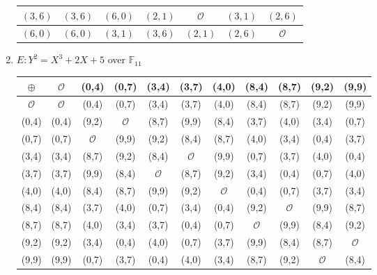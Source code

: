 \documentclass[a4paper, 11pt]{article}
\begin{document}
\begin{enumerate}[label=(\alph*)]
\begin{tabular}{|c|c|c|c|c|c|c|}
                $(3,6)$         &   $(3,6)$         &   $(6,0)$         &   $(2,1)$         &   $\mathcal{O}$   &   $(3,1)$         &   $(2,6)$\\ 
            \hline
                $(6,0)$         &   $(6,0)$         &   $(3,1)$         &   $(3,6)$         &   $(2,1)$         &   $(2,6)$         &   $\mathcal{O}$\\ 
            \hline
        \end{tabular}
        \item $E: Y^2 = X^3 + 2X + 5$ over $\mathbb{F}_{11}$\\
        \begin{tabular}{|c|c|c|c|c|c|c|c|c|c|c|} 
             \hline
                $\oplus$ & $\mathcal{O}$ & (0,4) & (0,7) & (3,4) & (3,7) & (4,0) & (8,4) & (8,7) & (9,2) & (9,9)\\
            \hline    
                $\mathcal{O}$ & $\mathcal{O}$ & (0,4) & (0,7) & (3,4) & (3,7) & (4,0) & (8,4) & (8,7) & (9,2) & (9,9)\\
            \hline                
                (0,4) & (0,4) & (9,2) & $\mathcal{O}$ & (8,7) & (9,9) & (8,4) & (3,7) & (4,0) & (3,4) & (0,7)\\
            \hline                
                (0,7) & (0,7) & $\mathcal{O}$ & (9,9) & (9,2) & (8,4) & (8,7) & (4,0) & (3,4) & (0,4) & (3,7)\\
            \hline                
                (3,4) & (3,4) & (8,7) & (9,2) & (8,4) & $\mathcal{O}$ & (9,9) & (0,7) & (3,7) & (4,0) & (0,4)\\
            \hline                
                (3,7) & (3,7) & (9,9) & (8,4) & $\mathcal{O}$ & (8,7) & (9,2) & (3,4) & (0,4) & (0,7) & (4,0)\\
            \hline                
                (4,0) & (4,0) & (8,4) & (8,7) & (9,9) & (9,2) & $\mathcal{O}$ & (0,4) & (0,7) & (3,7) & (3,4)\\
            \hline                
                (8,4) & (8,4) & (3,7) & (4,0) & (0,7) & (3,4) & (0,4) & (9,2) & $\mathcal{O}$ & (9,9) & (8,7)\\
            \hline                
                (8,7) & (8,7) & (4,0) & (3,4) & (3,7) & (0,4) & (0,7) & $\mathcal{O}$ & (9,9) & (8,4) & (9,2)\\
            \hline                
                (9,2) & (9,2) & (3,4) & (0,4) & (4,0) & (0,7) & (3,7) & (9,9) & (8,4) & (8,7) & $\mathcal{O}$\\
            \hline                
                (9,9) & (9,9) & (0,7) & (3,7) & (0,4) & (4,0) & (3,4) & (8,7) & (9,2) & $\mathcal{O}$ & (8,4)\\
            \hline                
        \end{tabular}
    \end{enumerate}
    
\end{document}
